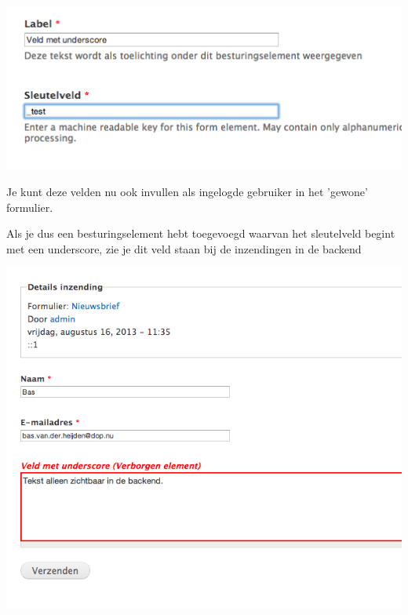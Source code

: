 \begin{center}
\includegraphics[width=\textwidth]{img/verborgenveld1.png}
\end{center}
Je kunt deze velden nu ook invullen als ingelogde gebruiker in het 'gewone' formulier.

Als je dus een besturingselement hebt toegevoegd waarvan het sleutelveld begint met een underscore, zie je dit veld staan bij de inzendingen in de backend

\begin{center}
\includegraphics[width=\textwidth]{img/verborgenveld2.png}
\end{center}
